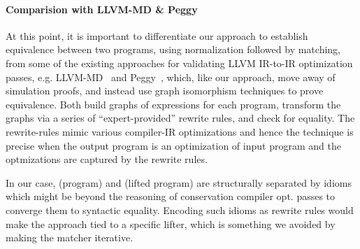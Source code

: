  

\paragraph{Comparision with LLVM-MD \& Peggy}
At this point, it is important to differentiate our approach to establish 
equivalence between two \LLVM programs, using  normalization followed by 
matching, 
from some of the existing
approaches for validating LLVM IR-to-IR optimization
passes, e.g. LLVM-MD~\cite{Tristan:2011} and Peggy~\cite{Stepp:2011}, which, 
like our approach, move away of simulation proofs, and instead use graph 
isomorphism techniques to prove equivalence. 
Both build graphs of expressions for each program, 
transform the graphs via a series of ``expert-provided'' rewrite rules, and 
check for equality. The rewrite-rules mimic various compiler-IR optimizations 
and hence the technique is precise when the output program is an 
optimization of input program and the optmizations are captured by the rewrite 
rules. 

In our case,  (\dlifted program) and  (\compd lifted 
program) are structurally separated by idioms which 
might be beyond the reasoning of conservation  compiler opt. passes to 
converge them to syntactic equality. 
Encoding such idioms as rewrite rules would make the 
approach tied to a specific lifter, which is something we avoided by 
making the matcher iterative. 






